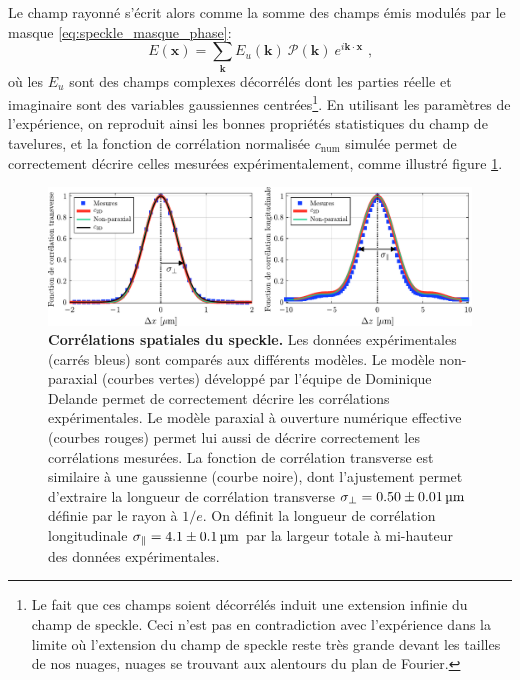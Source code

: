 Le champ rayonné s'écrit alors comme la somme des champs émis modulés par le masque \ref{eq:speckle_masque_phase}:
\begin{equation}
E(\mathbf{x})=\sum_{\mathbf{k}} E_u(\mathbf{k}) \: \mathcal{P}(\mathbf{k}) \: e^{i \mathbf{k} \cdot \mathbf{x}} \text{ ,}
\label{eq:huygens_fresnel_num}
\end{equation}
où les $E_u$ sont des champs complexes décorrélés dont les parties réelle et imaginaire sont des variables gaussiennes centrées\footnote{Le fait que ces champs soient décorrélés induit une extension infinie du champ de speckle. Ceci n'est pas en contradiction avec l'expérience dans la limite où l'extension du champ de speckle reste très grande devant les tailles de nos nuages, nuages se trouvant aux alentours du plan de Fourier.}. En utilisant les paramètres de l'expérience, on reproduit ainsi les bonnes propriétés statistiques du champ de tavelures, et la fonction de corrélation normalisée $c_{\mathrm{num}}$ simulée
permet de correctement décrire celles mesurées expérimentalement, comme illustré figure \ref{fig:speckle_correlations_exp}.





\begin{figure}
\centering
\includegraphics[width=\textwidth]{Fig/Speckle/speckle_correlations_exp.pdf}
\caption{\textbf{Corrélations spatiales du speckle.} Les données expérimentales (carrés bleus) sont comparés aux différents modèles. Le modèle non-paraxial (courbes vertes) développé par l'équipe de Dominique Delande permet de correctement décrire les corrélations expérimentales. Le modèle paraxial à ouverture numérique effective (courbes rouges) permet lui aussi de décrire correctement les corrélations mesurées. La fonction de corrélation transverse est similaire à une gaussienne (courbe noire), dont l'ajustement permet d'extraire la longueur de corrélation transverse $\sigma_{\perp}=0.50\pm\SI{0.01}{\micro\metre}$ définie par le rayon à $1/e$. On définit la longueur de corrélation longitudinale $\sigma_{\parallel}=4.1\pm\SI{0.1}{\micro\metre}$ par la largeur totale à mi-hauteur des données expérimentales.}
\label{fig:speckle_correlations_exp}
\end{figure}





